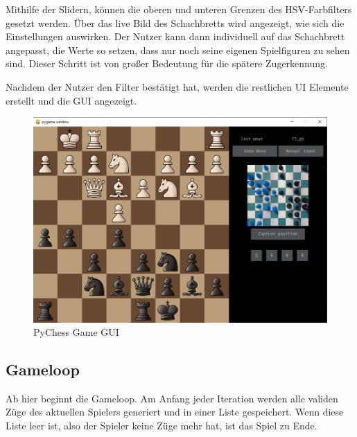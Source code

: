 Mithilfe der Slidern, können die oberen und unteren Grenzen des HSV-Farbfilters gesetzt werden. Über das live Bild des Schachbretts wird angezeigt, wie sich die 
Einstellungen auswirken. Der Nutzer kann dann individuell auf das Schachbrett angepasst, die Werte so setzen, dass nur noch seine eigenen Spielfiguren zu sehen sind.
Dieser Schritt ist von großer Bedeutung für die spätere Zugerkennung.

Nachdem der Nutzer den Filter bestätigt hat, werden die restlichen \ac{UI} Elemente erstellt und die GUI angezeigt. 
\begin{figure}[H]
    \centering
    \includegraphics[scale=0.6]{images/pychess_window.png}
    \caption{PyChess Game GUI}
    \label{fig:PychessGUI}
\end{figure}

\subsection{Gameloop}
Ab hier beginnt die Gameloop. Am Anfang jeder Iteration werden alle validen Züge des aktuellen Spielers generiert und in einer Liste gespeichert.
Wenn diese Liste leer ist, also der Spieler keine Züge mehr hat, ist das Spiel zu Ende. 

